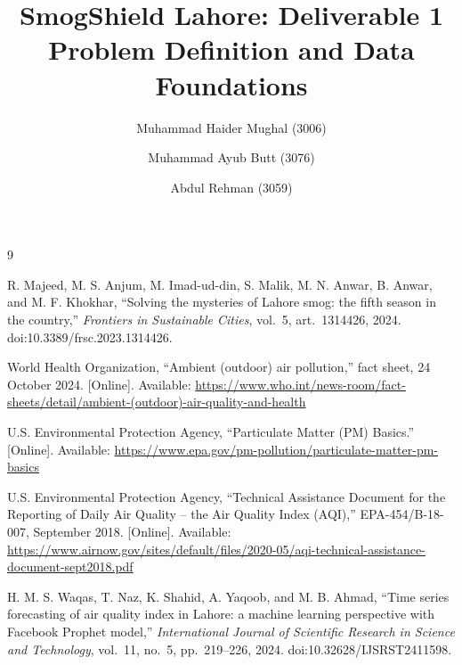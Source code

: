 \documentclass[11pt]{article}
\title{SmogShield Lahore: Deliverable 1\\Problem Definition and Data Foundations}
\author{Muhammad Haider Mughal (3006) \and Muhammad Ayub Butt (3076) \and Abdul Rehman (3059)}
\date{}
\begin{document}
\maketitle



\begin{thebibliography}{9}

R. Majeed, M. S. Anjum, M. Imad-ud-din, S. Malik, M. N. Anwar, B. Anwar, and M. F. Khokhar,
``Solving the mysteries of Lahore smog: the fifth season in the country,''
\emph{Frontiers in Sustainable Cities}, vol.~5, art.~1314426, 2024.
doi:10.3389/frsc.2023.1314426.

World Health Organization,
``Ambient (outdoor) air pollution,'' fact sheet, 24 October 2024.
[Online]. Available: \url{https://www.who.int/news-room/fact-sheets/detail/ambient-(outdoor)-air-quality-and-health}

U.S. Environmental Protection Agency,
``Particulate Matter (PM) Basics.''
[Online]. Available: \url{https://www.epa.gov/pm-pollution/particulate-matter-pm-basics}

U.S. Environmental Protection Agency,
``Technical Assistance Document for the Reporting of Daily Air Quality -- the Air Quality Index (AQI),'' EPA-454/B-18-007, September 2018.
[Online]. Available: \url{https://www.airnow.gov/sites/default/files/2020-05/aqi-technical-assistance-document-sept2018.pdf}

H. M. S. Waqas, T. Naz, K. Shahid, A. Yaqoob, and M. B. Ahmad,
``Time series forecasting of air quality index in Lahore: a machine learning perspective with Facebook Prophet model,''
\emph{International Journal of Scientific Research in Science and Technology}, vol.~11, no.~5, pp.~219--226, 2024.
doi:10.32628/IJSRST2411598.

\end{thebibliography}
\end{document}
